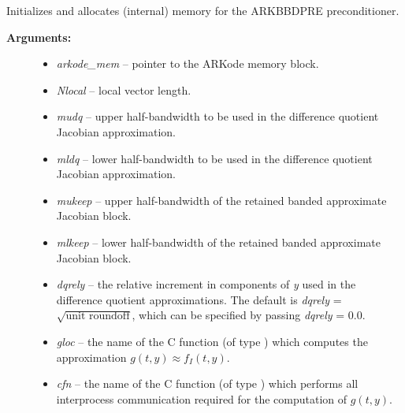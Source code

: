 \documentclass[letterpaper,10pt,english]{sphinxmanual}
\begin{document}
\begin{fulllineitems}
\label{c_interface/Preconditioners:ARKBBDPrecInit}
Initializes and allocates (internal) memory for the
ARKBBDPRE preconditioner.
\begin{description}
\item[{\textbf{Arguments:}}] \leavevmode\begin{itemize}
\item {} 
\emph{arkode\_mem} -- pointer to the ARKode memory block.

\item {} 
\emph{Nlocal} -- local vector length.

\item {} 
\emph{mudq} -- upper half-bandwidth to be used in the difference
quotient Jacobian approximation.

\item {} 
\emph{mldq} -- lower half-bandwidth to be used in the difference
quotient Jacobian approximation.

\item {} 
\emph{mukeep} -- upper half-bandwidth of the retained banded
approximate Jacobian block.

\item {} 
\emph{mlkeep} -- lower half-bandwidth of the retained banded
approximate Jacobian block.

\item {} 
\emph{dqrely} -- the relative increment in components of \emph{y} used in
the difference quotient approximations.  The default is \emph{dqrely}
= $\sqrt{\text{unit roundoff}}$, which can be specified by
passing \emph{dqrely} = 0.0.

\item {} 
\emph{gloc} -- the name of the C function (of type {\hyperref[c_interface/Preconditioners:ARKLocalFn]{}})
which computes the approximation $g(t,y) \approx f_I(t,y)$.

\item {} 
\emph{cfn} -- the name of the C function (of type {\hyperref[c_interface/Preconditioners:ARKCommFn]{}}) which
performs all interprocess communication required for the
computation of $g(t,y)$.


\end{itemize}
\end{description}
\end{fulllineitems}
\end{document}
